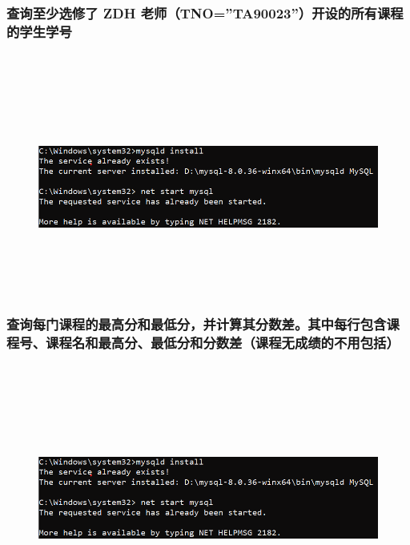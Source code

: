 \documentclass{ctexart}
\begin{document}
\subsubsection{查询至少选修了 ZDH 老师（TNO=”TA90023”）开设的所有课程的学生学号}
\begin{lstlisting}[language=sql]
	
\end{lstlisting}
\begin{figure}[H]
	\centering 
	\includegraphics[height=7cm,width=14cm]{1.png}
	\end{figure}
\subsubsection{查询每门课程的最高分和最低分，并计算其分数差。其中每行包含课程号、课程名和最高分、最低分和分数差（课程无成绩的不用包括）}
\begin{lstlisting}[language=sql]
	
\end{lstlisting}
\begin{figure}[H]
	\centering 
	\includegraphics[height=7cm,width=14cm]{1.png}
	\end{figure}
\end{document}
